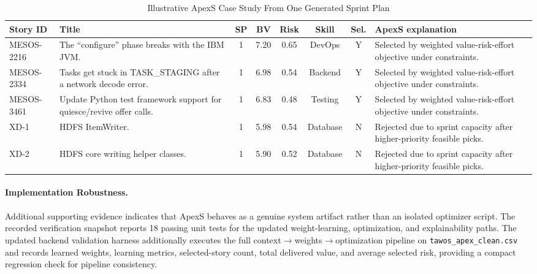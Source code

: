 \documentclass[conference]{IEEEtran}
\begin{document}
\begin{table}[t]
	\caption{Illustrative ApexS Case Study From One Generated Sprint Plan}
	\label{tab:case-study}
	\centering\scriptsize
	\begin{tabularx}{\textwidth}{l>{\raggedright\arraybackslash}p{2.5in}cccccY}
		\toprule
		Story ID   & Title                                                                & SP & BV   & Risk & Skill    & Sel. & ApexS explanation                                                     \\
		\midrule
		MESOS-2216 & The ``configure'' phase breaks with the IBM JVM.                     & 1  & 7.20 & 0.65 & DevOps   & Y    & Selected by weighted value-risk-effort objective under constraints.   \\
		MESOS-2334 & Tasks get stuck in TASK\_STAGING after a network decode error.       & 1  & 6.98 & 0.54 & Backend  & Y    & Selected by weighted value-risk-effort objective under constraints.   \\
		MESOS-3461 & Update Python test framework support for quiesce/revive offer calls. & 1  & 6.83 & 0.48 & Testing  & Y    & Selected by weighted value-risk-effort objective under constraints.   \\
		XD-1       & HDFS ItemWriter.                                                     & 1  & 5.98 & 0.54 & Database & N    & Rejected due to sprint capacity after higher-priority feasible picks. \\
		XD-2       & HDFS core writing helper classes.                                    & 1  & 5.90 & 0.52 & Database & N    & Rejected due to sprint capacity after higher-priority feasible picks. \\
		\bottomrule
	\end{tabularx}
\end{table}

\paragraph{Implementation Robustness.}
Additional supporting evidence indicates that ApexS behaves as a genuine system
artifact rather than an isolated optimizer script.
The recorded verification snapshot reports 18 passing unit tests for the updated
weight-learning, optimization, and explainability paths. The updated backend
validation harness additionally executes
the full context$\rightarrow$weights$\rightarrow$optimization pipeline on
\texttt{tawos\_apex\_clean.csv} and records learned weights, learning metrics,
selected-story count, total delivered value, and average selected risk, providing a
compact regression check for pipeline consistency.
\end{document}
